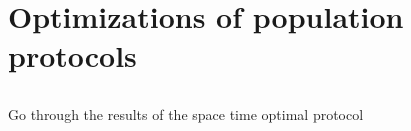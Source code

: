 \section{Optimizations of population protocols}

\subsection{}

Go through the results of the space time optimal protocol \cite{dotyTimeSpaceOptimal2022}


\clearpage